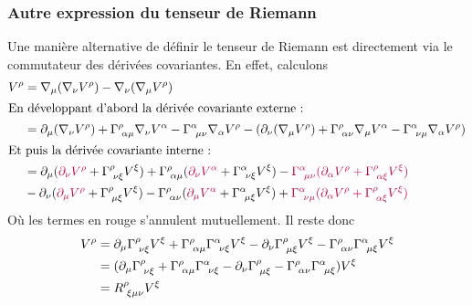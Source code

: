 \subsubsection{Autre expression du tenseur de Riemann}
Une manière alternative de définir le tenseur de Riemann est directement via le commutateur des dérivées covariantes. En effet, calculons
\begin{align*}
    [\nabla_{\mu}, \nabla_{\nu}]V^{\rho} &= \nabla_{\mu}(\nabla_{\nu}V^{\rho}) - \nabla_{\nu}(\nabla_{\mu}V^{\rho})\\
    \intertext{En développant d'abord la dérivée covariante externe :}
    &= \partial_{\mu}(\nabla_{\nu}V^{\rho}) + \Gamma\indices{^{\rho}_{\!\alpha \mu}}\nabla_{\nu}V^{\alpha}-\Gamma\indices{^{\alpha}_{\!\mu \nu}}\nabla_{\alpha}V^{\rho} -(\partial_{\nu}(\nabla_{\mu}V^{\rho}) + \Gamma\indices{^{\rho}_{\!\alpha \nu}}\nabla_{\mu}V^{\alpha} - \Gamma\indices{^{\alpha}_{\!\nu \mu}} \nabla_{\alpha}V^{\rho})\\
    \intertext{Et puis la dérivée covariante interne :}
    &= \partial_{\mu}(\textcolor{purple}{\partial_{\nu}V^{\rho}} + \Gamma\indices{^{\rho}_{\!\nu \xi}} V^{\xi}) + \Gamma\indices{^{\rho}_{\!\alpha \mu}}(\textcolor{purple}{\partial_{\nu}V^{\alpha}}+\Gamma\indices{^{\alpha}_{\!\nu \xi}} V^{\xi}) - \textcolor{purple}{\Gamma\indices{^{\alpha}_{\!\mu \nu}}(\partial_{\alpha}V^{\rho} + \Gamma\indices{^{\rho}_{\!\alpha \xi}} V^{\xi})} \\
    &-\partial_{\nu}(\textcolor{purple}{\partial_{\mu}V^{\rho}} + \Gamma\indices{^{\rho}_{\!\mu \xi}}V^{\xi}) - \Gamma\indices{^{\rho}_{\!\alpha \nu}}(\textcolor{purple}{\partial_{\mu}V^{\alpha}}+\Gamma\indices{^{\alpha}_{\!\mu \xi}} V^{\xi}) +\textcolor{purple}{\Gamma\indices{^{\alpha}_{\!\nu \mu}}(\partial_{\alpha}V^{\rho} + \Gamma\indices{^{\rho}_{\!\alpha \xi}}V^{\xi})}
\end{align*}
Où les termes en rouge s'annulent mutuellement. Il reste donc
\begin{align}
    [\nabla_{\mu}, \nabla_{\nu}]V^{\rho} &= \partial_{\mu}\Gamma\indices{^{\rho}_{\!\nu \xi}}V^{\xi} + \Gamma\indices{^{\rho}_{\!\alpha \mu}}\Gamma\indices{^{\alpha}_{\!\nu \xi}}V^{\xi} -\partial_{\nu}\Gamma\indices{^{\rho}_{\!\mu \xi}}V^{\xi} -\Gamma\indices{^{\rho}_{\!\alpha \nu}}\Gamma\indices{^{\alpha}_{\!\mu \xi}}V^{\xi}\\
    &= (\partial_{\mu}\Gamma\indices{^{\rho}_{\!\nu \xi}} + \Gamma\indices{^{\rho}_{\!\alpha \mu}}\Gamma\indices{^{\alpha}_{\!\nu \xi}} - \partial_{\nu}\Gamma\indices{^{\rho}_{\!\mu \xi}} - \Gamma\indices{^{\rho}_{\!\alpha \nu}}\Gamma\indices{^{\alpha}_{\!\mu \xi}})V^{\xi}\\
    \label{eq: Riemann commutateur}
    &= R\indices{^{\rho}_{\!\xi \mu \nu}}V^{\xi}
\end{align}
